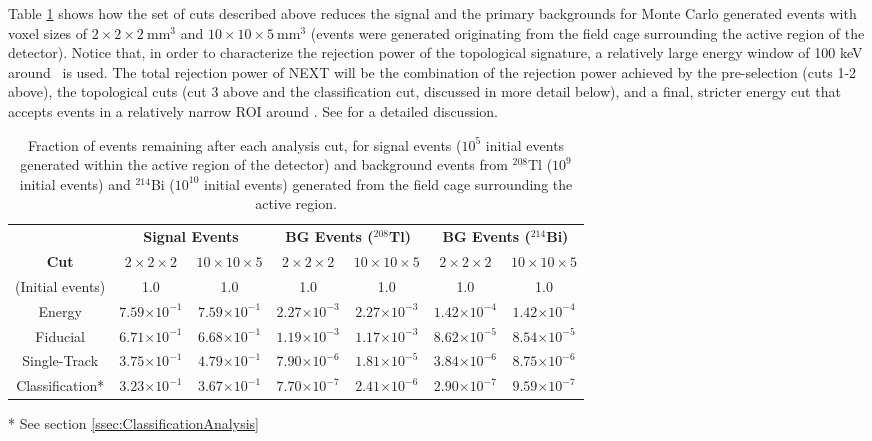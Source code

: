 \documentclass[a4paper,11pt]{article}
\begin{document}
Table \ref{tbl.FastAnalysisResults} shows how the set of cuts described above reduces the signal and the primary backgrounds for Monte Carlo generated events with voxel sizes of $2 \times 2 \times 2 \mathrm{~mm^3}$ and $10 \times 10 \times 5 \mathrm{~mm^3}$ (events were generated originating from the field cage surrounding the active region of the detector).  Notice that, in order to characterize the rejection power of the topological signature, a relatively large energy window of 100 keV around \Qbb\ is used. The total rejection power of NEXT will be the combination of the rejection power achieved by the pre-selection (cuts 1-2 above), the topological cuts (cut 3 above and the classification cut, discussed in more detail below), and a final, stricter energy cut that accepts events in a relatively narrow ROI around \Qbb. See \cite{NEXT_sensitivity} for a detailed discussion.

\begin{table}[!htb]
	\begin{center}
		\caption[Fast analysis summary]{\label{tbl.FastAnalysisResults}Fraction of events remaining after each analysis cut, for signal events ($10^5$ initial events generated within the active region of the detector) and background events from $^{208}$Tl ($10^{9}$ initial events) and $^{214}$Bi ($10^{10}$ initial events) generated from the field cage surrounding the active region.}
		\begin{tabular}{c|cc|cc|cc}
			\\
			 & \multicolumn{2}{c}{\textbf{Signal Events}} & \multicolumn{2}{c}{\textbf{BG Events ($^{208}$Tl)}} & \multicolumn{2}{c}{\textbf{BG Events ($^{214}$Bi)}}\\
			\textbf{Cut} & $2 \times 2 \times 2$ & $10 \times 10 \times 5$ & $2 \times 2 \times 2$ & $10 \times 10 \times 5$ & $2 \times 2 \times 2$ & $10 \times 10 \times 5$\\
			\hline
			(Initial events) & 1.0 & 1.0 & 1.0 & 1.0 & 1.0 & 1.0\\
			Energy & $7.59$\small{$\times 10^{-1}$} & $7.59$\small{$\times 10^{-1}$} & $2.27$\small{$\times 10^{-3}$} & $2.27$\small{$\times 10^{-3}$} & $1.42$\small{$\times 10^{-4}$} & $1.42$\small{$\times 10^{-4}$}\\
			Fiducial & $6.71$\small{$\times 10^{-1}$} & $6.68$\small{$\times 10^{-1}$} & $1.19$\small{$\times 10^{-3}$} & $1.17$\small{$\times 10^{-3}$} & $8.62$\small{$\times 10^{-5}$} & $8.54$\small{$\times 10^{-5}$}\\
			Single-Track & $3.75$\small{$\times 10^{-1}$} & $4.79$\small{$\times 10^{-1}$} & $7.90$\small{$\times 10^{-6}$} & $1.81$\small{$\times 10^{-5}$} & $3.84$\small{$\times 10^{-6}$} & $8.75$\small{$\times 10^{-6}$}\\
			Classification* & $3.23$\small{$\times 10^{-1}$} & $3.67$\small{$\times 10^{-1}$} & $7.70$\small{$\times 10^{-7}$} & $2.41$\small{$\times 10^{-6}$} & $2.90$\small{$\times 10^{-7}$} & $9.59$\small{$\times 10^{-7}$}\\
		\end{tabular}
	\end{center}
	* See section \ref{ssec:ClassificationAnalysis}
\end{table}
\end{document}
